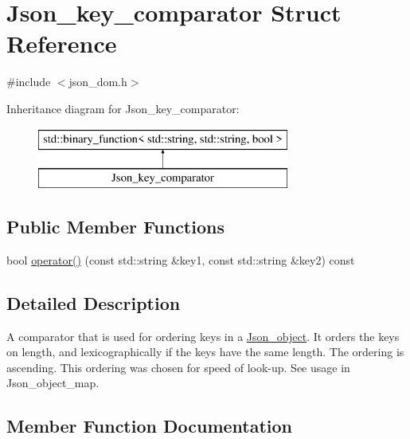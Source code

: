 \hypertarget{structJson__key__comparator}{}\section{Json\+\_\+key\+\_\+comparator Struct Reference}
\label{structJson__key__comparator}


{\ttfamily \#include $<$json\+\_\+dom.\+h$>$}

Inheritance diagram for Json\+\_\+key\+\_\+comparator\+:\begin{figure}[H]
\begin{center}
\leavevmode
\includegraphics[height=2.000000cm]{structJson__key__comparator}
\end{center}
\end{figure}
\subsection*{Public Member Functions}
\begin{DoxyCompactItemize}
\item 
bool \mbox{\hyperlink{structJson__key__comparator_a7d1a1e90eca547bbaf63b20b41410648}{operator()}} (const std\+::string \&key1, const std\+::string \&key2) const
\end{DoxyCompactItemize}


\subsection{Detailed Description}
A comparator that is used for ordering keys in a \mbox{\hyperlink{classJson__object}{Json\+\_\+object}}. It orders the keys on length, and lexicographically if the keys have the same length. The ordering is ascending. This ordering was chosen for speed of look-\/up. See usage in Json\+\_\+object\+\_\+map. 

\subsection{Member Function Documentation}
\mbox{\label{structJson__key__comparator_a7d1a1e90eca547bbaf63b20b41410648}} 
